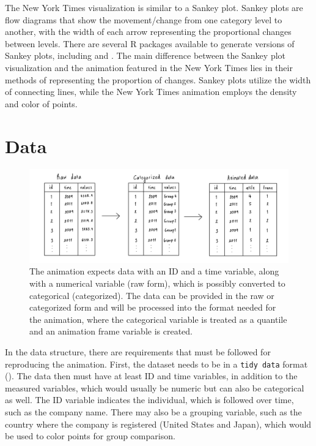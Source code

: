 The New York Times visualization is similar to a Sankey plot. Sankey plots are flow diagrams that show the movement/change from one category level to another, with the width of each arrow representing the proportional changes between levels. There are several R packages available to generate versions of Sankey plots, including  and . The main difference between the Sankey plot visualization and the animation featured in the New York Times lies in their methods of representing the proportion of changes. Sankey plots utilize the width of connecting lines, while the New York Times animation employs the density and color of points.

\section{Data}\label{data}

\begin{figure}

{\centering \includegraphics[width=1\linewidth]{figures/data-diagram} 

}

\caption{The animation expects data with an ID and a time variable, along with a numerical variable (raw form), which is possibly converted to categorical (categorized). The data can be provided in the raw or categorized form and will be processed into the format needed for the animation, where the categorical variable is treated as a quantile and an animation frame variable is created.}\label{fig:data-diagram}
\end{figure}

In the data structure, there are requirements that must be followed for reproducing the animation. First, the dataset needs to be in a \texttt{tidy\ data} format (\citet{tidy-data}). The data then must have at least ID and time variables, in addition to the measured variables, which would usually be numeric but can also be categorical as well. The ID variable indicates the individual, which is followed over time, such as the company name. There may also be a grouping variable, such as the country where the company is registered (United States and Japan), which would be used to color points for group comparison.

